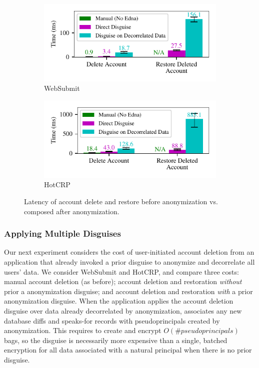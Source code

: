 \begin{figure}[t]
    \centering
    \begin{subfigure}[b]{\columnwidth}
        \includegraphics{figs/composition_stats_websubmit}
        \caption{WebSubmit}
        \label{f:comp-websubmit}
      \end{subfigure}
      \begin{subfigure}[b]{\columnwidth}
        \includegraphics{figs/composition_stats_hotcrp}
          \caption{HotCRP}
        \label{f:comp-hotcrp}
      \end{subfigure}
    \caption{Latency of account delete and restore before anonymization vs. composed after anonymization.}
    \label{f:composition}
\end{figure}

\subsubsection{Applying Multiple Disguises}
%
Our next experiment considers the cost of user-initiated account
deletion from an application that already invoked a prior disguise
to anonymize and decorrelate all users' data.
%
We consider WebSubmit and HotCRP, and compare three costs: \one{}
manual account deletion (as before); \two{} account deletion and
restoration \emph{without} prior a anonymization disguise; and
\three{} account deletion and restoration \emph{with} a prior
anonymization disguise.
%
When the application applies the account deletion disguise over data
already decorrelated by anonymization, \sys associates any new
database diffs and speaks-for records with pseudoprincipals created
by anonymization.
%
This requires \sys to create and encrypt
$O(\textit{\# pseudoprincipals})$ bags, so the disguise is necessarily
more expensive than a single, batched encryption for all data
associated with a natural principal when there is no prior disguise.
%

